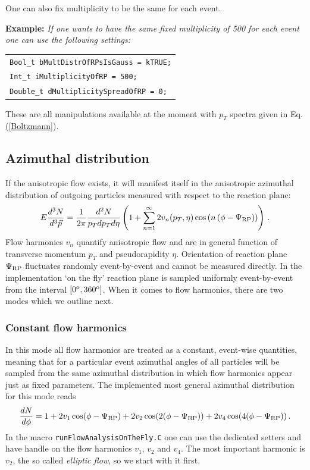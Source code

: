 \documentclass[a4paper]{book}
\numberwithin{equation}{subsection}
\begin{document}
\noindent One can also fix multiplicity to be the same for each event.

\vspace{0.5cm}
\noindent\textbf{Example:} \textit{If one wants to have the same fixed multiplicity of 500 for each event one can use the following settings:}
%
\begin{center}
\begin{tabular}[t]{l}
\texttt{Bool\_t bMultDistrOfRPsIsGauss = kTRUE;} \\
\texttt{Int\_t iMultiplicityOfRP = 500;} \\
\texttt{Double\_t dMultiplicitySpreadOfRP = 0;}
\end{tabular}
\end{center}
%
\vspace{0.5cm}

\noindent These are all manipulations available at the moment with $p_T$ spectra given in Eq. (\ref{Boltzmann}). 

\subsection{Azimuthal distribution}
If the anisotropic flow exists, it will manifest itself in the anisotropic azimuthal distribution of outgoing particles measured with respect to the reaction plane:
%
\begin{equation}
E\frac{d^3 N}{d^3 \vec{p}} = \frac{1}{2\pi} \frac{d^2 N}{p_T dp_T d\eta} \left( 1+\sum_{n=1}^{\infty}2v_n(p_T, \eta) \cos\left( n\left( \phi-\Psi_{\rm RP}\right) \right) \right)\,.
\label{azimuthalDistributionGeneral}
\end{equation}
%
Flow harmonics $v_n$ quantify anisotropic flow and are in general function of transverse momentum $p_T$ and pseudorapidity $\eta$. Orientation of reaction plane $\Psi_{\rm RP}$ fluctuates randomly event-by-event and cannot be measured directly. In the implementation `on the fly' reaction plane is sampled uniformly event-by-event from the interval $[0^{\rm o},360^{\rm o}]$. When it comes to flow harmonics, there are two modes which we outline next.

\subsubsection{Constant flow harmonics}
In this mode all flow harmonics are treated as a constant, event-wise quantities, meaning that for a particular event azimuthal angles of all particles will be sampled from the same azimuthal distribution in which flow harmonics appear just as fixed parameters. The implemented most general azimuthal distribution for this mode reads 
%
\begin{equation}
\frac{dN}{d\phi} = 1+2v_1\cos(\phi-\Psi_{\rm RP})+2v_2\cos(2(\phi-\Psi_{\rm RP}))+2v_4\cos(4(\phi-\Psi_{\rm RP}))\,.
\label{azimuthalDistributionOnlyPhi}
\end{equation}
%
In the macro \texttt{runFlowAnalysisOnTheFly.C} one can use the dedicated setters and have handle on the flow harmonics $v_1$, $v_2$ and $v_4$. The most important harmonic is $v_2$, the so called \textit{elliptic flow}, so we start with it first. 
\end{document}
